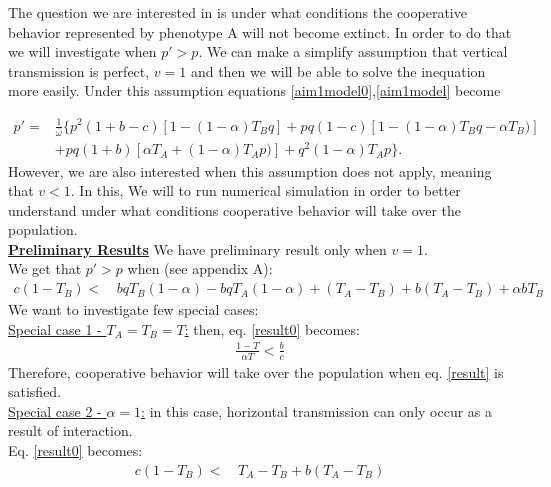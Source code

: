 \documentclass{article}
\begin{document}
The question we are interested in is under what conditions the cooperative behavior represented by phenotype A will not become extinct. In order to do that we will investigate when $p' > p$.
We can make a simplify assumption that vertical transmission is perfect, $v=1$ and then we will be able to solve the inequation more easily. Under this assumption equations \eqref{aim1model0},\eqref{aim1model} become

\begin{equation} 
\begin{split}\label{modeleq}
p' =& \frac{1}{\overline{\omega}} \{ p^2(1+b-c)[1-(1-\alpha)T_Bq] + pq(1-c)[1-(1-\alpha)T_Bq-\alpha T_B)]\\
&+ pq(1+b)[\alpha T_A+(1-\alpha)T_Ap)] + q^2(1-\alpha)T_Ap\}.
\end{split}
\end{equation}
However, we are also interested when this assumption does not apply, meaning that $v<1$. In this, We will to run numerical simulation in order to better understand under what conditions cooperative behavior will take over the population. 
\\\textbf{\underline{Preliminary Results}}
We have preliminary result only when $v=1$.
\\We get that $p'>p$ when (see appendix A):
\begin{equation} 
\begin{split} \label{result0}
 c(1-T_B) < & \,  bqT_B(1-\alpha) - bqT_A(1-\alpha) + (T_A-T_B) + b(T_A - T_B) + \alpha bT_B
\end{split}
\end{equation}
We want to investigate few special cases:
\\\underline{Special case 1 - $T_A = T_B = T$:} then, eq. \eqref{result0} becomes:
\begin{equation}
\begin{split} \label{result}
 \frac{1-T}{\alpha T}< \frac{b}{c}
\end{split}
\end{equation}
Therefore, cooperative behavior will take over the population when eq. \eqref{result} is satisfied.  
\\\underline{Special case 2 - $\alpha =1$:} in this case, horizontal transmission can only occur as a result of interaction.
\\Eq. \eqref{result0} becomes:
\begin{equation} 
\begin{split} \label{result3}
c(1-T_B)  < & \, T_A -T_B +b(T_A-T_B)
\end{split}
\end{equation}
\end{document}

